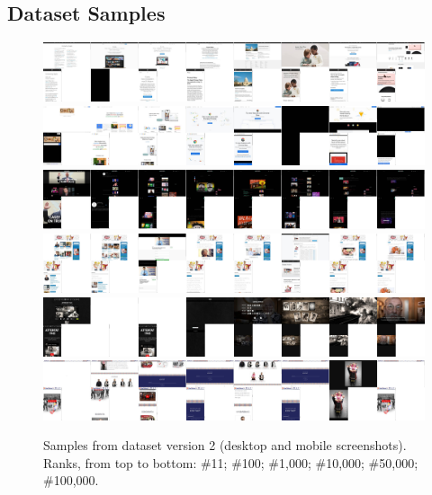 \subsection{Dataset Samples}

\begin{figure}[h]
    \centering
    \includegraphics[clip,width=\columnwidth]{resources/dataset/v2-000011.png}\vspace{4mm}
    \includegraphics[clip,width=\columnwidth]{resources/dataset/v2-000100.png}\vspace{4mm}
    \includegraphics[clip,width=\columnwidth]{resources/dataset/v2-001000.png}\vspace{4mm}
    \includegraphics[clip,width=\columnwidth]{resources/dataset/v2-010000.png}\vspace{4mm}
    \includegraphics[clip,width=\columnwidth]{resources/dataset/v2-050000.png}\vspace{4mm}
    \includegraphics[clip,width=\columnwidth]{resources/dataset/v2-100000.png}
    \caption[Samples from dataset version 2]{Samples from dataset version 2 (desktop and mobile screenshots). Ranks, from top to bottom: \#11; \#100; \#1,000; \#10,000; \#50,000; \#100,000.}
    \label{fig:dataset samples}
\end{figure}